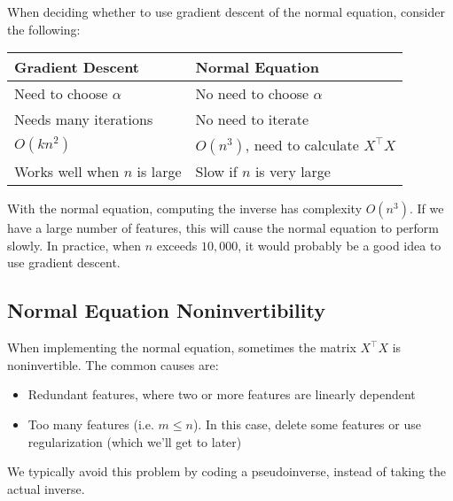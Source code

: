 When deciding whether to use gradient descent of the normal equation, consider the following:

\begin{tabular}{| l | l |} \hline
\textbf{Gradient Descent} & \textbf{Normal Equation} \\
\hline \hline
Need to choose $\alpha$ & No need to choose $\alpha$ \\ \hline
Needs many iterations & No need to iterate \\ \hline
$O\left( kn^2 \right)$ & $O\left(n^3\right)$, need to calculate $X^\intercal X$ \\ \hline
Works well when $n$ is large & Slow if $n$ is very large \\ \hline
\end{tabular}

With the normal equation, computing the inverse has complexity $O\left( n^3 \right)$. If we have a large number of features, this will cause the normal equation to perform slowly. In practice, when $n$ exceeds $10,000$, it would probably be a good idea to use gradient descent. 

\subsection{Normal Equation Noninvertibility}
When implementing the normal equation, sometimes the matrix $X^\intercal X$ is noninvertible. The common causes are:
\begin{itemize}
\item Redundant features, where two or more features are linearly dependent
\item Too many features (i.e. $m \leq n$). In this case, delete some features or use regularization (which we'll get to later)
\end{itemize}

We typically avoid this problem by coding a pseudoinverse, instead of taking the actual inverse. 






















